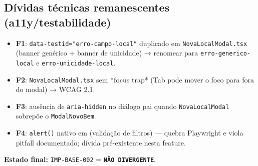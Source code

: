 \subsection{Dívidas técnicas remanescentes (a11y/testabilidade)}

\begin{itemize}
  \item \textbf{F1}: \texttt{data-testid="erro-campo-local"} duplicado em
  \texttt{NovaLocalModal.tsx} (banner genérico + banner de unicidade) → renomear
  para \texttt{erro-generico-local} e \texttt{erro-unicidade-local}.
  \item \textbf{F2}: \texttt{NovaLocalModal.tsx} sem *focus trap* (Tab pode mover
  o foco para fora do modal) → WCAG 2.1.
  \item \textbf{F3}: ausência de \texttt{aria-hidden} no diálogo pai quando
  \texttt{NovaLocalModal} sobrepõe o \texttt{ModalNovoBem}.
  \item \textbf{F4}: \texttt{alert()} nativo em
   (validação de filtros) — quebra
  Playwright e viola pitfall documentado; dívida pré-existente nesta feature.
\end{itemize}

\textbf{Estado final:} \texttt{IMP-BASE-002} = \textbf{\texttt{NÃO DIVERGENTE}}.
